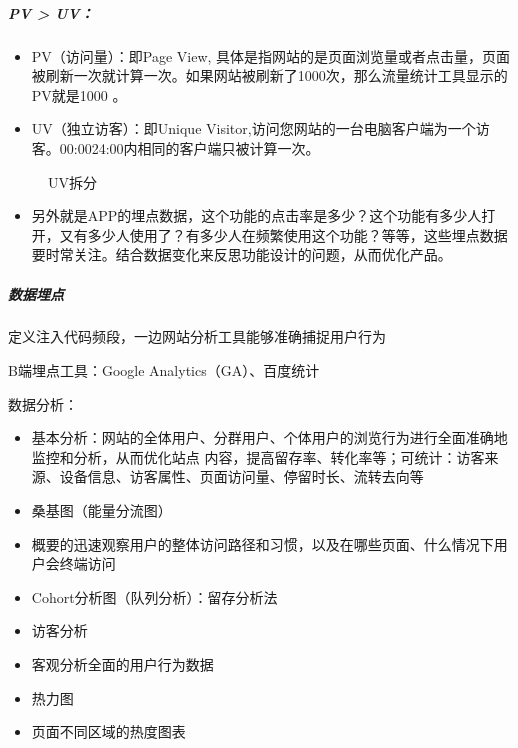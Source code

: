 \documentclass[letterpaper,11pt,english]{sphinxmanual}
\begin{document}
\subparagraph{PV > UV：}
\label{\detokenize{chapter_skill/data_analysis:pv-uv}}\begin{itemize}
\item {} 
PV（访问量）：即Page View,
具体是指网站的是页面浏览量或者点击量，页面被刷新一次就计算一次。如果网站被刷新了1000次，那么流量统计工具显示的PV就是1000
。

\item {} 
UV（独立访客）：即Unique
Visitor,访问您网站的一台电脑客户端为一个访客。00:00\sphinxhyphen{}24:00内相同的客户端只被计算一次。

\end{itemize}

\begin{figure}[H]
\centering
\capstart

\noindent{}
\caption{UV拆分}\label{\detokenize{chapter_skill/data_analysis:id14}}\end{figure}
\begin{itemize}
\item {} 
另外就是APP的埋点数据，这个功能的点击率是多少？这个功能有多少人打开，又有多少人使用了？有多少人在频繁使用这个功能？等等，这些埋点数据要时常关注。结合数据变化来反思功能设计的问题，从而优化产品。

\end{itemize}


\subparagraph{数据埋点}
\label{\detokenize{chapter_skill/data_analysis:id7}}
定义注入代码频段，一边网站分析工具能够准确捕捉用户行为

B端埋点工具：Google Analytics（GA）、百度统计

数据分析：
\begin{itemize}
\item {} 
基本分析：网站的全体用户、分群用户、个体用户的浏览行为进行全面准确地监控和分析，从而优化站点
内容，提高留存率、转化率等；可统计：访客来源、设备信息、访客属性、页面访问量、停留时长、流转去向等

\item {} 
桑基图（能量分流图）

\item {} 
概要的迅速观察用户的整体访问路径和习惯，以及在哪些页面、什么情况下用户会终端访问

\item {} 
Cohort分析图（队列分析）：留存分析法

\item {} 
访客分析

\item {} 
客观分析全面的用户行为数据

\item {} 
热力图

\item {} 
页面不同区域的热度图表

\end{itemize}
\end{document}
